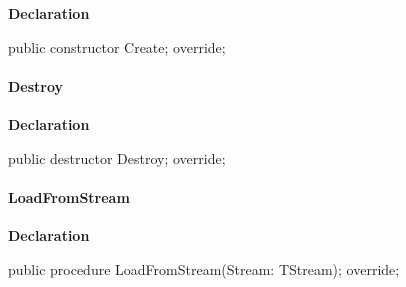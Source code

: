 \documentclass{report}
\newif\ifpdf
\begin{document}
\label{opbitmapformats.TPNGImage-Create}
\begin{list}{}{
\setlength{\itemindent}{0cm}
\setlength{\listparindent}{0cm}
\setlength{\leftmargin}{\evensidemargin}
\addtolength{\leftmargin}{\tmplength}
\settowidth{\labelsep}{X}
\addtolength{\leftmargin}{\labelsep}
\setlength{\labelwidth}{\tmplength}
}
\item[\textbf{Declaration}\hfill]
\ifpdf
\begin{flushleft}
\fi
\begin{ttfamily}
public constructor Create; override;\end{ttfamily}

\ifpdf
\end{flushleft}
\fi

\end{list}
\paragraph*{Destroy}\hspace*{\fill}

\label{opbitmapformats.TPNGImage-Destroy}
\begin{list}{}{
\setlength{\itemindent}{0cm}
\setlength{\listparindent}{0cm}
\setlength{\leftmargin}{\evensidemargin}
\addtolength{\leftmargin}{\tmplength}
\settowidth{\labelsep}{X}
\addtolength{\leftmargin}{\labelsep}
\setlength{\labelwidth}{\tmplength}
}
\item[\textbf{Declaration}\hfill]
\ifpdf
\begin{flushleft}
\fi
\begin{ttfamily}
public destructor Destroy; override;\end{ttfamily}

\ifpdf
\end{flushleft}
\fi

\end{list}
\paragraph*{LoadFromStream}\hspace*{\fill}

\label{opbitmapformats.TPNGImage-LoadFromStream}
\begin{list}{}{
\setlength{\itemindent}{0cm}
\setlength{\listparindent}{0cm}
\setlength{\leftmargin}{\evensidemargin}
\addtolength{\leftmargin}{\tmplength}
\settowidth{\labelsep}{X}
\addtolength{\leftmargin}{\labelsep}
\setlength{\labelwidth}{\tmplength}
}
\item[\textbf{Declaration}\hfill]
\ifpdf
\begin{flushleft}
\fi
\begin{ttfamily}
public procedure LoadFromStream(Stream: TStream); override;\end{ttfamily}

\ifpdf
\end{flushleft}
\fi

\end{list}
\end{document}
